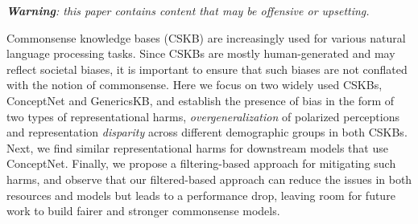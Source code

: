
\emph{\textbf{Warning}: this paper contains content that may
be offensive or upsetting.}


Commonsense knowledge bases (CSKB) are increasingly used for various natural language processing tasks. Since CSKBs are mostly human-generated and may reflect societal biases, it is important to ensure that such biases are not conflated with the notion of commonsense. Here we focus on two widely used CSKBs, ConceptNet and GenericsKB, and establish the presence of bias in the form of two types of representational harms, \emph{overgeneralization} of polarized perceptions and representation \emph{disparity} across different demographic groups in both CSKBs. Next, we find similar representational harms for downstream models that use ConceptNet. Finally, we propose a filtering-based approach for mitigating such harms, and observe that our filtered-based approach can reduce the issues in both resources and models but leads to a performance drop, leaving room for future work to build fairer and stronger commonsense models.

